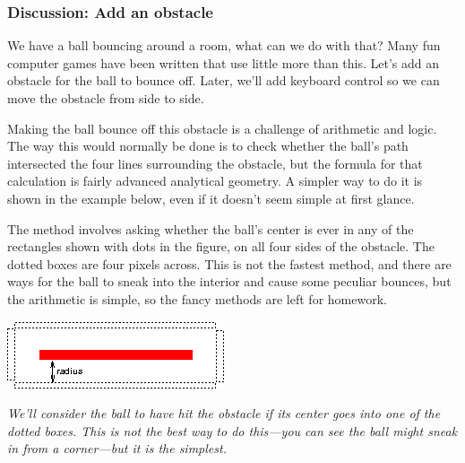 \documentclass[11pt]{article}
\newcommand{\capt}[1]{\begin{minipage}{0.75\columnwidth}\itshape#1\end{minipage}}
\begin{document}
\subsubsection{Discussion: Add an obstacle}

We have a ball bouncing around a room, what can we do with that?  Many
fun computer games have been written that use little more than this.
Let's add an obstacle for the ball to bounce off.  Later, we'll add
keyboard control so we can move the obstacle from side to side.

Making the ball bounce off this obstacle is a challenge of arithmetic
and logic.  The way this would normally be done is to check whether
the ball's path intersected the four lines surrounding the obstacle,
but the formula for that calculation is fairly advanced analytical
geometry.  A simpler way to do it is shown in the example below, even
if it doesn't seem simple at first glance.

The method involves asking whether the ball's center is ever in any of
the rectangles shown with dots in the figure, on all four sides of the
obstacle.  The dotted boxes are four pixels across.  This is not the
fastest method, and there are ways for the ball to sneak into the
interior and cause some peculiar bounces, but the arithmetic is
simple, so the fancy methods are left for homework.

\begin{center}
\includegraphics{pong-paddle.png}

\capt{We'll consider the ball to have hit the obstacle if its center
  goes into one of the dotted boxes.  This is not the best way to do
  this---you can see the ball might sneak in from a corner---but it is
  the simplest.}
\end{center}
\end{document}
